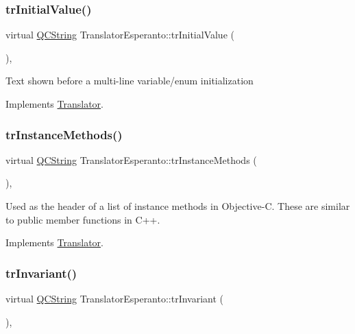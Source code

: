 \subsubsection{\texorpdfstring{trInitialValue()}{trInitialValue()}}
{\footnotesize\ttfamily virtual \mbox{\hyperlink{class_q_c_string}{Q\+C\+String}} Translator\+Esperanto\+::tr\+Initial\+Value (\begin{DoxyParamCaption}{ }\end{DoxyParamCaption})\hspace{0.3cm}{\ttfamily [inline]}, {\ttfamily [virtual]}}

Text shown before a multi-\/line variable/enum initialization 

Implements \mbox{\hyperlink{class_translator}{Translator}}.

\mbox{\label{class_translator_esperanto_a2f78ff2e2f94b3c82fbbeaec27454b75}} 
\subsubsection{\texorpdfstring{trInstanceMethods()}{trInstanceMethods()}}
{\footnotesize\ttfamily virtual \mbox{\hyperlink{class_q_c_string}{Q\+C\+String}} Translator\+Esperanto\+::tr\+Instance\+Methods (\begin{DoxyParamCaption}{ }\end{DoxyParamCaption})\hspace{0.3cm}{\ttfamily [inline]}, {\ttfamily [virtual]}}

Used as the header of a list of instance methods in Objective-\/C. These are similar to public member functions in C++. 

Implements \mbox{\hyperlink{class_translator}{Translator}}.

\mbox{\label{class_translator_esperanto_abafa635227781832f7089c17abe00f28}} 
\subsubsection{\texorpdfstring{trInvariant()}{trInvariant()}}
{\footnotesize\ttfamily virtual \mbox{\hyperlink{class_q_c_string}{Q\+C\+String}} Translator\+Esperanto\+::tr\+Invariant (\begin{DoxyParamCaption}{ }\end{DoxyParamCaption})\hspace{0.3cm}{\ttfamily [inline]}, {\ttfamily [virtual]}}

